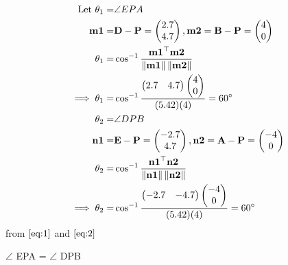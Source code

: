 \documentclass[10pt]{article}
\newcommand{\myvec}[1]{\ensuremath{\begin{pmatrix}#1\end{pmatrix}}}
\providecommand{\norm}[1]{\left\lVert#1\right\rVert}
\let\vec\mathbf{}
\begin{document}
\begin{align}
\text{ Let  }\theta_1=&\angle EPA\\
\vec{m1}=&\vec{D}-\vec{P}=\myvec{2.7\\4.7}, \vec{m2}=\vec{B}-\vec{P}=\myvec{4\\0}\\
\theta_1=&\cos^{-1}\frac{\vec{m1}^\top\vec{m2}}{\norm{\vec{m1}}\norm{\vec{m2}}}\\
\implies\theta_1=&\cos^{-1}\frac{\myvec{2.7&4.7}\myvec{4\\0}}{(5.42)(4)}=60\degree
\label{eq:1}\\
\theta_2=&\angle DPB\\
\vec{n1}=&\vec{E}-\vec{P}=\myvec{-2.7\\4.7}, \vec{n2}=\vec{A}-\vec{P}=\myvec{-4\\0}\\
\theta_2 =& \cos^{-1}\frac{\vec{n1}^\top\vec{n2}}{\norm{\vec{n1}}\norm{\vec{n2}}}\\
\implies\theta_2=&\cos^{-1}\frac{\myvec{-2.7&-4.7}\myvec{-4\\0}}{(5.42)(4)}=60\degree
\label{eq:2}
\end{align}
from $\eqref{eq:1}$ and $\eqref{eq:2}$
\begin{center}
$\angle$ EPA = $\angle$ DPB
\end{center}
\end{document}
